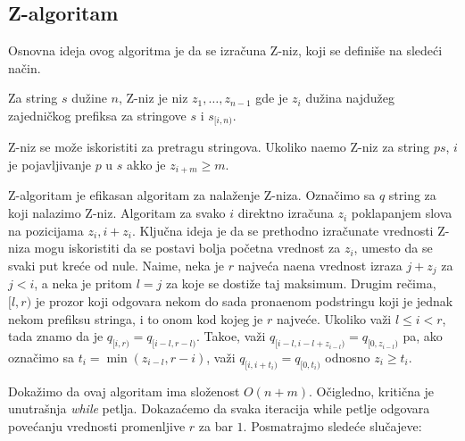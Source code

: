 \noindent
\begin{minipage}[l]{\textwidth}

\end{minipage}

\subsection{Z-algoritam}

Osnovna ideja ovog algoritma je da se izra\v cuna Z-niz, koji se defini\v se na slede\' ci na\v cin.

\begin{dfn}
Za string $s$ du\v zine $n$, Z-niz je niz $z_1, \ldots, z_{n-1}$ gde je $z_i$ du\v zina najdu\v zeg zajedni\v ckog prefiksa za stringove $s$ i $s_{[i, n)}$.
\end{dfn}

Z-niz se mo\v ze iskoristiti za pretragu stringova. Ukoliko na\dj emo Z-niz za string $ps$, $i$ je pojavljivanje $p$ u $s$ akko je $z_{i+m} \geq m$.

Z-algoritam je efikasan algoritam za nala\v zenje Z-niza.\cite{zalgoknjiga} Ozna\v cimo sa $q$ string za koji nalazimo Z-niz. Algoritam za svako $i$ direktno izra\v cuna $z_i$ poklapanjem slova na pozicijama $z_i, i + z_i$. Klju\v cna ideja je da se prethodno izra\v cunate vrednosti Z-niza mogu iskoristiti da se postavi bolja po\v cetna vrednost za $z_i$, umesto da se svaki put kre\' ce od nule. Naime, neka je $r$ najve\' ca na\dj ena vrednost izraza $j+z_j$ za $j<i$, a neka je pritom $l = j$ za koje se dosti\v ze taj maksimum. Drugim re\v cima, $[l, r)$ je prozor koji odgovara nekom do sada prona\dj enom podstringu koji je jednak nekom prefiksu stringa, i to onom kod kojeg je $r$ najve\' ce. Ukoliko va\v zi $l \leq i < r$, tada znamo da je $q_{[i, r)} = q_{[i-l, r-l)}$. Tako\dj e, va\v zi $q_{[i-l, i-l+z_{i-l})} = q_{[0, z_{i-l})}$ pa, ako ozna\v cimo sa $t_i = \min(z_{i-l}, r-i)$, va\v zi $q_{[i, i+t_i)} = q_{[0, t_i)}$ odnosno $z_i \geq t_i$.

\noindent
\begin{minipage}[l]{\textwidth}

\end{minipage}

Doka\v zimo da ovaj algoritam ima slo\v zenost $O(n+m)$. O\v cigledno, kriti\v cna je unutra\v snja \textit{while} petlja. Dokaza\' cemo da svaka iteracija while petlje odgovara pove\' canju vrednosti promenljive $r$ za bar $1$. Posmatrajmo slede\' ce slu\v cajeve:

